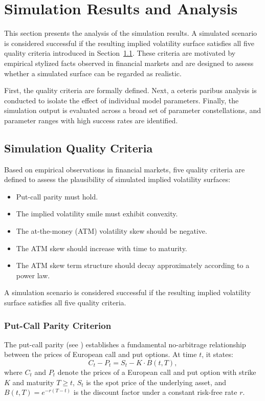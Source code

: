 \section{Simulation Results and Analysis} \label{sec:SimulationResultsAnalysis}

This section presents the analysis of the simulation results. A simulated scenario is considered successful if the resulting implied volatility surface satisfies all five quality criteria introduced in Section~\ref{subsec:SimulationQualityCriteria}. These criteria are motivated by empirical stylized facts observed in financial markets and are designed to assess whether a simulated surface can be regarded as realistic.

First, the quality criteria are formally defined. Next, a ceteris paribus analysis is conducted to isolate the effect of individual model parameters. Finally, the simulation output is evaluated across a broad set of parameter constellations, and parameter ranges with high success rates are identified.


\subsection{Simulation Quality Criteria} \label{subsec:SimulationQualityCriteria}

Based on empirical observations in financial markets, five quality criteria are defined to assess the plausibility of simulated implied volatility surfaces:
\begin{itemize}
    \item Put-call parity must hold.
    \item The implied volatility smile must exhibit convexity.
    \item The at-the-money (ATM) volatility skew should be negative.
    \item The ATM skew should increase with time to maturity.
    \item The ATM skew term structure should decay approximately according to a power law.
\end{itemize}
A simulation scenario is considered successful if the resulting implied volatility surface satisfies all five quality criteria.

\subsubsection*{Put-Call Parity Criterion}
The put-call parity (see \citealp{Björk2009}) establishes a fundamental no-arbitrage relationship between the prices of European call and put options. At time $t$, it states:
\begin{equation} \label{eq:PutCallParity}
    C_t - P_t = S_t - K \cdot B(t,T),
\end{equation}
where $C_t$ and $P_t$ denote the prices of a European call and put option with strike $K$ and maturity $T \geq t$, $S_t$ is the spot price of the underlying asset, and $B(t,T) = e^{-r(T - t)}$ is the discount factor under a constant risk-free rate $r$.

